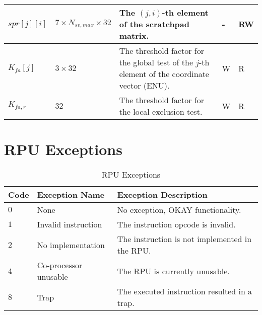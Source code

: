 \documentclass[11pt]{article}
\begin{document}
\begin{table}[htbp]
\begin{center}
\begin{tabular}{|m{1.5cm}|m{1.5cm}|m{6cm}|m{1cm}|m{1cm}|}
    $spr[j][i]$ & $7 \times N_{sv,max} \times 32$ & The $(j,i)$-th element of the scratchpad matrix. & - & RW\\ \hline

    $K_{fa}[j]$ & $3 \times 32$ & The threshold factor for the global test of the $j$-th element of the coordinate vector (ENU). & W & R\\ \hline

    $K_{fa,r}$ & $32$ & The threshold factor for the local exclusion test. & W & R\\ \hline
  \end{tabular}
\end{center}
\end{table}

\section{RPU Exceptions}

\begin{table}[htbp] \begin{center}
  \caption{RPU Exceptions}\label{tab:exc}
  \begin{tabular}{|m{1.5cm}|m{3.5cm}|m{7cm}|}
    \hline
    \textbf{Code} & \textbf{Exception Name} & \textbf{Exception Description}\\ \hline

    $0$ & None & No exception, OKAY functionality.\\ \hline

    $1$ & Invalid instruction & The instruction opcode is invalid.\\ \hline

    $2$ & No implementation & The instruction is not implemented in the RPU.\\ \hline

    $4$ & Co-processor unusable & The RPU is currently unusable.\\ \hline

    $8$ & Trap & The executed instruction resulted in a trap.\\ \hline
  \end{tabular}
\end{center}
\end{table}
\end{document}
